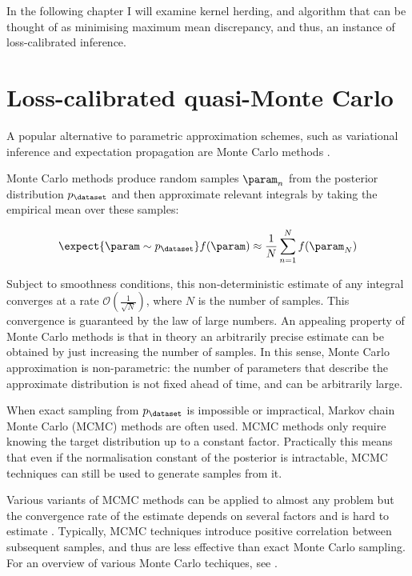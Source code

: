 In the following chapter I will examine kernel herding, and algorithm that can be thought of as minimising maximum mean discrepancy, and thus, an instance of loss-calibrated inference.

\section{Loss-calibrated quasi-Monte Carlo}

A popular alternative to parametric approximation schemes, such as variational inference and expectation propagation are Monte Carlo methods \citep[see \eg][]{Murray2007}.

Monte Carlo methods produce random samples $\param_n$ from the posterior distribution $p_\dataset$ and then approximate relevant integrals by taking the empirical mean over these samples:

\begin{equation}
	\expect{\param \sim p_{\dataset}} f(\param) \approx \frac{1}{N} \sum_{n = 1}^{N} f(\param_N)
\end{equation}

Subject to smoothness conditions, this non-deterministic estimate of any integral converges at a rate $\mathcal{O}(\frac{1}{\sqrt{N}})$, where $N$ is the number of samples. This convergence is guaranteed by the law of large numbers. An appealing property of Monte Carlo methods is that in theory an arbitrarily precise estimate can be obtained by just increasing the number of samples. In this sense, Monte Carlo approximation is non-parametric: the number of parameters that describe the approximate distribution is not fixed ahead of time, and can be arbitrarily large.

When exact sampling from $p_\dataset$ is impossible or impractical, Markov chain Monte Carlo (MCMC) methods are often used. MCMC methods only require knowing the target distribution up to a constant factor. Practically this means that even if the normalisation constant of the posterior is intractable, MCMC techniques can still be used to generate samples from it.

Various variants of MCMC methods can be applied to almost any problem but the convergence rate of the estimate depends on several factors and is hard to estimate \citep{CowlesCarlin96}. Typically, MCMC techniques introduce positive correlation between subsequent samples, and thus are less effective than exact Monte Carlo sampling. For an overview of various Monte Carlo techiques, see \citep{Murray2007}.

